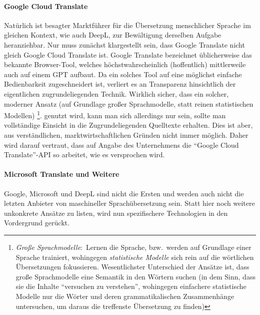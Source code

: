 \paragraph*{Google Cloud Translate}\par
Natürlich ist besagter Marktführer für die Übersetzung menschlicher Sprache im gleichen Kontext, wie auch DeepL, zur Bewältigung derselben Aufgabe heranziehbar. Nur muss zunächst klargestellt sein, dass Google Translate nicht gleich Google Cloud Translate ist. Google Translate bezeichnet üblicherweise das bekannte Browser-Tool, welches höchstwahrscheinlich (hoffentlich) mittlerweile auch auf einem GPT aufbaut. Da ein solches Tool auf eine möglichst einfache Bedienbarkeit zugeschneidert ist, verliert es an Transparenz hinsichtlich der eigentlichen zugrundeliegenden Technik. Wirklich sicher, dass ein solcher, moderner
Ansatz (auf Grundlage großer Sprachmodelle, statt reinen statistischen Modellen)
\footnote{\textit{Große Sprachmodelle}:\ Lernen die Sprache, bzw.\ werden auf Grundlage einer Sprache trainiert, wohingegen \textit{statistische Modelle} sich rein auf die wörtlichen Übersetzungen fokussieren. Wesentlichster Unterschied der Ansätze ist, dass große Sprachmodelle eine Semantik in den Wörtern suchen (in dem Sinn, dass sie die Inhalte \enquote{versuchen zu verstehen}, wohingegen einfachere statistische Modelle nur die Wörter und deren grammatikalischen Zusammenhänge untersuchen, um daraus die treffenste Übersetzung zu finden)}.
genutzt wird, kann man sich allerdings nur sein, sollte man vollständige Einsicht in die Zugrundeliegenden Quelltexte erhalten. Dies ist aber, aus verständlichen, marktwirtschaftlichen Gründen nicht immer möglich. Daher wird darauf vertraut, dass auf Angabe des Unternehmens die \enquote{Google Cloud Translate}-API so arbeitet, wie es versprochen wird.%

\paragraph*{Microsoft Translate und Weitere}\par
Google, Microsoft und DeepL sind nicht die Ersten und werden auch nicht die letzten Anbieter von maschineller Sprachübersetzung sein. Statt hier noch weitere unkonkrete Ansätze zu listen, wird nun spezifischere Technologien in den Vordergrund gerückt.

